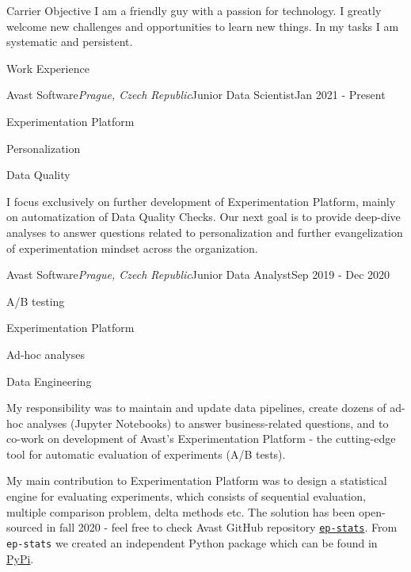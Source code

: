 \documentclass{resume} %
\begin{document}
\begin{rSection}{Carrier Objective}
I am a friendly guy with a passion for technology. I greatly welcome new challenges and opportunities to learn new things. In my tasks I am systematic and persistent.
\end{rSection}

\begin{rSection}{Work Experience}
 
    \begin{rSubsection}{Avast Software}{\em Prague, Czech Republic}{Junior Data Scientist}{Jan 2021 - Present}
        \item Experimentation Platform
        \item Personalization
        \item Data Quality
        
        I focus exclusively on further development of Experimentation Platform, mainly on automatization of Data Quality Checks. Our next goal is to provide deep-dive analyses to answer questions related to personalization and further evangelization of experimentation mindset across the organization.
        
    \end{rSubsection}
        
    \begin{rSubsection}{Avast Software}{\em Prague, Czech Republic}{Junior Data Analyst}{Sep 2019 - Dec 2020}
        \item A/B testing
        \item Experimentation Platform
        \item Ad-hoc analyses
        \item Data Engineering
        
        My responsibility was to maintain and update data pipelines, create dozens of ad-hoc analyses (Jupyter Notebooks) to answer business-related questions, and to co-work on development of Avast's Experimentation Platform - the cutting-edge tool for automatic evaluation of experiments (A/B tests).
        
        My main contribution to Experimentation Platform was to design a statistical engine for evaluating experiments, which consists of sequential evaluation, multiple comparison problem, delta methods etc. The solution has been open-sourced in fall 2020 - feel free to check Avast GitHub repository \href{https://github.com/avast/ep-stats}{\texttt{ep-stats}}. From \texttt{ep-stats} we created an independent Python package which can be found in \href{https://pypi.org/project/ep-stats/}{PyPi}.
        

\end{rSubsection}
\end{rSection}
\end{document}
